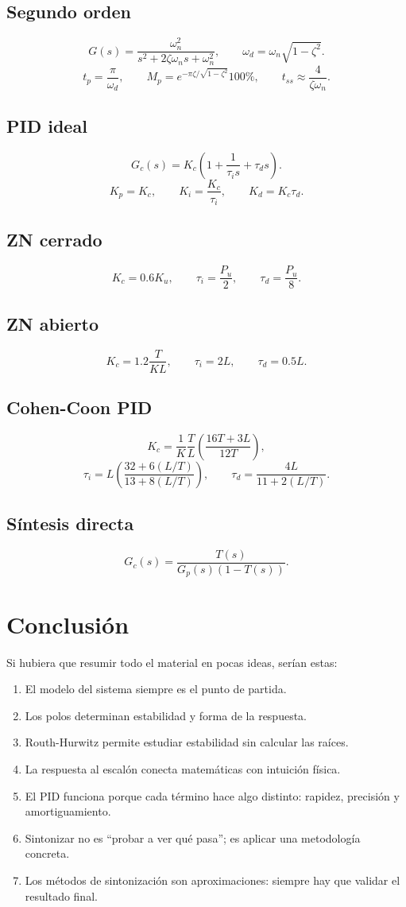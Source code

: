 \documentclass[11pt]{article}
\begin{document}
\subsection{Segundo orden}
\[
G(s)=\frac{\omega_n^2}{s^2+2\zeta\omega_n s+\omega_n^2},
\qquad
\omega_d=\omega_n\sqrt{1-\zeta^2}.
\]
\[
t_p=\frac{\pi}{\omega_d},\qquad
M_p=e^{-\pi\zeta/\sqrt{1-\zeta^2}}100\%,\qquad
t_{ss}\approx \frac{4}{\zeta\omega_n}.
\]

\subsection{PID ideal}
\[
G_c(s)=K_c\left(1+\frac{1}{\tau_i s}+\tau_d s\right).
\]
\[
K_p=K_c,\qquad
K_i=\frac{K_c}{\tau_i},\qquad
K_d=K_c\tau_d.
\]

\subsection{ZN cerrado}
\[
K_c=0.6K_u,\qquad
\tau_i=\frac{P_u}{2},\qquad
\tau_d=\frac{P_u}{8}.
\]

\subsection{ZN abierto}
\[
K_c=1.2\frac{T}{KL},\qquad
\tau_i=2L,\qquad
\tau_d=0.5L.
\]

\subsection{Cohen-Coon PID}
\[
K_c=\frac{1}{K}\frac{T}{L}\left(\frac{16T+3L}{12T}\right),
\]
\[
\tau_i=L\left(\frac{32+6(L/T)}{13+8(L/T)}\right),
\qquad
\tau_d=\frac{4L}{11+2(L/T)}.
\]

\subsection{S\'intesis directa}
\[
G_c(s)=\frac{T(s)}{G_p(s)(1-T(s))}.
\]

\section{Conclusi\'on}
Si hubiera que resumir todo el material en pocas ideas, ser\'ian estas:
\begin{enumerate}[label=\arabic*.]
\item El modelo del sistema siempre es el punto de partida.
\item Los polos determinan estabilidad y forma de la respuesta.
\item Routh-Hurwitz permite estudiar estabilidad sin calcular las ra\'ices.
\item La respuesta al escal\'on conecta matem\'aticas con intuici\'on f\'isica.
\item El PID funciona porque cada t\'ermino hace algo distinto: rapidez, precisi\'on y amortiguamiento.
\item Sintonizar no es ``probar a ver qu\'e pasa''; es aplicar una metodolog\'ia concreta.
\item Los m\'etodos de sintonizaci\'on son aproximaciones: siempre hay que validar el resultado final.
\end{enumerate}
\end{document}
